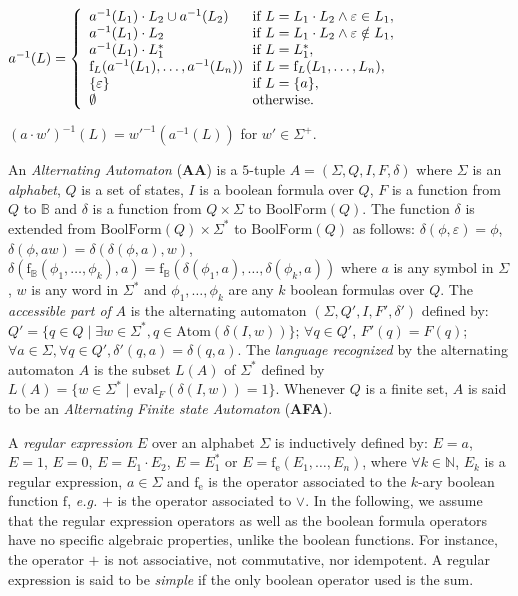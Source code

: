 \documentclass{article}
\begin{document}
	    $a^{-1}(L)=
	      \left\{
	        \begin{array}{l@{\ }l}
	          a^{-1}(L_1)\cdot  L_2 \cup a^{-1}(L_2) & \text{ if } L=L_1 \cdot  L_2\wedge \varepsilon\in L_1,\\
	          a^{-1}(L_1)\cdot  L_2 & \text{ if } L=L_1\cdot  L_2\wedge \varepsilon\notin L_1,\\
	          a^{-1}(L_1)\cdot  L_1^{*} & \text{ if } L=L_1^{*},\\
	          \mathrm{f}_L(a^{-1}(L_1),\ldots,a^{-1}(L_n)) & \text{ if } L=\mathrm{f}_L(L_1,\ldots,L_n),\\
	          \{\varepsilon\} & \text{ if } L=\{a\},\\
	          \emptyset & \text{ otherwise.}\\
	        \end{array}
	      \right.$
	      

$(a\cdot w')^{-1}(L)=w'^{-1}(a^{-1}(L))$ for $w'\in \Sigma^+$.

  

  An \emph{Alternating Automaton} (\textbf{AA}) is a $5$-tuple $A=(\Sigma,Q,I,F,\delta)$ where $\Sigma$ is an \emph{alphabet}, $Q$ is a set of states, $I$ is a boolean formula over $Q$, $F$ is a function from $Q$ to $\mathbb{B}$ and $\delta$ is a function from $Q\times\Sigma$ to $\mathrm{BoolForm}(Q)$. The function $\delta$ is extended from $\mathrm{BoolForm}(Q)\times \Sigma^*$ to $\mathrm{BoolForm}(Q)$ as follows: $\delta(\phi,\varepsilon)=\phi$, $\delta(\phi,aw)=\delta(\delta(\phi,a),w)$, $\delta(\mathrm{f}_{\mathbb{B}}(\phi_1,\ldots,\phi_k),a)=\mathrm{f}_{\mathbb{B}}(\delta(\phi_1,a),\ldots,\delta(\phi_k,a))$ where $a$ is any symbol in $\Sigma$, $w$ is any word in $\Sigma^*$ and $\phi_1,\ldots,\phi_k$ are any $k$ boolean formulas over $Q$.
  The \emph{accessible part of} $A$ is the alternating automaton $(\Sigma,Q',I,F',\delta')$ defined by: 
$Q'=\{q\in Q\mid\exists w\in\Sigma^{*}, q\in\mathrm{Atom}(\delta(I,w))\}$;
  $\forall q\in Q'$, $F'(q)=F(q)$; $\forall a\in\Sigma, \forall q\in Q', \delta'(q,a)=\delta(q,a)$.  
  The \emph{language recognized} by the alternating automaton $A$ is the subset $L(A)$ of $\Sigma^*$ defined by $L(A)=\{w\in\Sigma^*\mid\mathrm{eval}_F(\delta(I,w))=1\}$.
  Whenever $Q$ is a finite set, $A$ is said to be an \emph{Alternating Finite state Automaton} (\textbf{AFA}).   
    
  A \emph{regular expression} $E$ over an alphabet $\Sigma$ is inductively defined by: $E=a$, $E=1$, $E=0$, $E=E_1\cdot E_2$, $E=E_1^*$ or $E=\mathrm{f}_{\mathrm{e}}(E_1,\ldots,E_n)$, where $\forall k\in \mathbb{N}$, $E_k$ is a regular expression, $a\in\Sigma$ and $\mathrm{f}_{\mathrm{e}}$ is the operator associated to the $k$-ary boolean function $\mathrm{f}$, \emph{e.g.} $+$ is the operator associated to $\vee$.
  In the following, we assume that the regular expression operators as well as the boolean formula operators have no specific algebraic properties, unlike the boolean functions. For instance, the operator $+$ is not associative, not commutative, nor idempotent. 
 A regular expression is said to be \emph{simple} if the only boolean operator used is the sum.  
 
\end{document}
